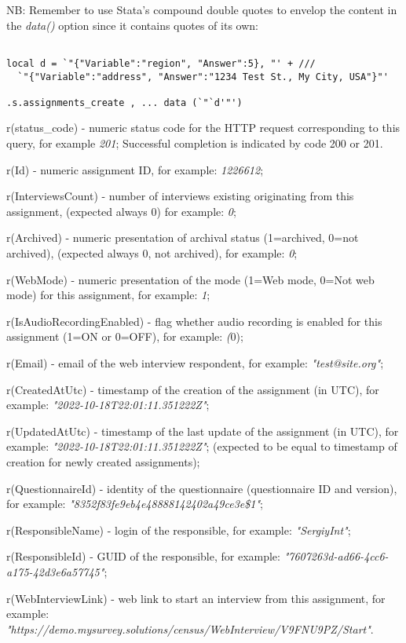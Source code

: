NB: Remember to use Stata's compound double quotes to envelop the content in
the \textit{data()} option since it contains quotes of its own:

\begin{lstlisting}[style=CommandLineStyle]

local d = `"{"Variable":"region", "Answer":5}, "' + ///
  `"{"Variable":"address", "Answer":"1234 Test St., My City, USA"}"'

.s.assignments_create , ... data (`"`d'"')

\end{lstlisting}


\savedres
\begin{compactitem}
    \item r(status\_code) - numeric status code for the HTTP request corresponding to this query, for example \textit{201}; Successful completion is indicated by code 200 or 201.
    \item r(Id) - numeric assignment ID, for example: \textit{1226612};
    \item r(InterviewsCount) - number of interviews existing originating from this assignment, (expected always 0) for example: \textit{0};
    \item r(Archived) - numeric presentation of archival status (1=archived, 0=not archived), (expected always 0, not archived), for example: \textit{0};
    \item r(WebMode) - numeric presentation of the mode (1=Web mode, 0=Not web mode) for this assignment, for example: \textit{1};
    \item r(IsAudioRecordingEnabled) - flag whether audio recording is enabled for this assignment (1=ON or 0=OFF), for example: \textit(0);
    \item r(Email) - email of the web interview respondent, for example: \textit{"test@site.org"};
    \item r(CreatedAtUtc) - timestamp of the creation of the assignment (in UTC), for example: \textit{"2022-10-18T22:01:11.351222Z"};
    \item r(UpdatedAtUtc) - timestamp of the last update of the assignment (in UTC), for example: \textit{"2022-10-18T22:01:11.351222Z"}; (expected to be equal to timestamp of creation for newly created assignments);
    \item r(QuestionnaireId) - identity of the questionnaire (questionnaire ID and version), for example: \textit{"8352f83fe9eb4e48888142402a49ce3e\$1"};
    \item r(ResponsibleName) - login of the responsible, for example: \textit{"SergiyInt"};
    \item r(ResponsibleId) - GUID of the responsible, for example: \textit{"7607263d-ad66-4cc6-a175-42d3e6a57745"};
    \item r(WebInterviewLink) - web link to start an interview from this assignment, for example: \textit{"https://demo.mysurvey.solutions/census/WebInterview/V9FNU9PZ/Start"}.
\end{compactitem}

